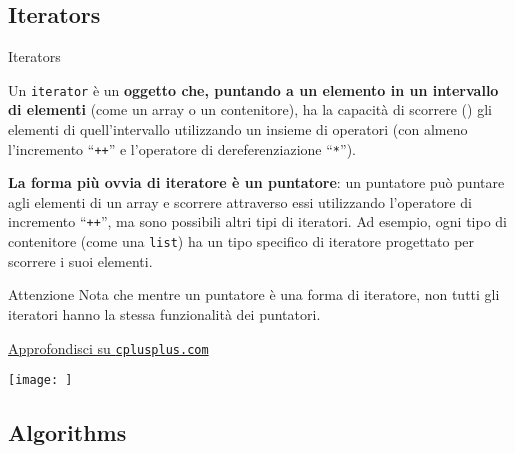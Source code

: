 \documentclass[xcolor={dvipsnames, svgnames, x11names, table}, 10pt]{beamer}
\begin{document}
\subsection{Iterators}

\begin{frame}[t]{Iterators}

Un \texttt{iterator} è un \textbf{oggetto che, puntando a un elemento in un intervallo di elementi} (come un array o un contenitore), ha la capacità di scorrere () gli elementi di quell'intervallo utilizzando un insieme di operatori (con almeno l'incremento \enquote{\texttt{+}\(\!\)\texttt{+}} e l'operatore di dereferenziazione \enquote{\texttt{*}}).

\pause

\textbf{La forma più ovvia di iteratore è un puntatore}: un puntatore può puntare agli elementi di un array e scorrere attraverso essi utilizzando l'operatore di incremento \enquote{\texttt{+}\(\!\)\texttt{+}}, ma sono possibili altri tipi di iteratori.
Ad esempio, ogni tipo di contenitore (come una \texttt{list}) ha un tipo specifico di iteratore progettato per scorrere i suoi elementi.

\pause

\begin{alertblock}{Attenzione}
Nota che mentre un puntatore è una forma di iteratore, non tutti gli iteratori hanno la stessa funzionalità dei puntatori.
\end{alertblock}

\href{https://www.cplusplus.com/reference/iterator/}{Approfondisci su \texttt{cplusplus.com} \ExternalLink}

\end{frame}

\begin{frame}{}

\texttt{[image: ]}

\end{frame}

\subsection{Algorithms}
\end{document}
